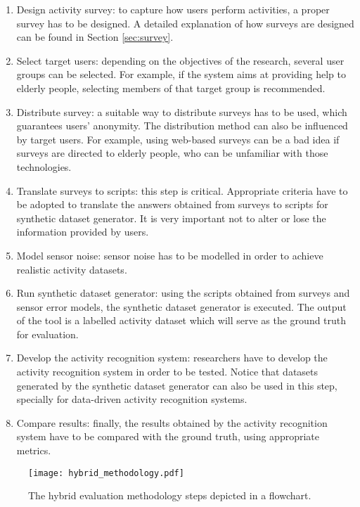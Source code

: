 \begin{enumerate}
 \item Design activity survey: to capture how users perform activities, a proper survey has to be designed. A detailed explanation of how surveys are designed can be found in Section \ref{sec:survey}.
 \item Select target users: depending on the objectives of the research, several user groups can be selected. For example, if the system aims at providing help to elderly people, selecting members of that target group is recommended.
 \item Distribute survey: a suitable way to distribute surveys has to be used, which guarantees users' anonymity. The distribution method can also be influenced by target users. For example, using web-based surveys can be a bad idea if surveys are directed to elderly people, who can be unfamiliar with those technologies. 
 \item Translate surveys to scripts: this step is critical. Appropriate criteria have to be adopted to translate the answers obtained from surveys to scripts for synthetic dataset generator. It is very important not to alter or lose the information provided by users.
 \item Model sensor noise: sensor noise has to be modelled in order to achieve realistic activity datasets. 
 \item Run synthetic dataset generator: using the scripts obtained from surveys and sensor error models, the synthetic dataset generator is executed. The output of the tool is a labelled activity dataset which will serve as the ground truth for evaluation.
 \item Develop the activity recognition system: researchers have to develop the activity recognition system in order to be tested. Notice that datasets generated by the synthetic dataset generator can also be used in this step, specially for data-driven activity recognition systems.
 \item Compare results: finally, the results obtained by the activity recognition system have to be compared with the ground truth, using appropriate metrics.
\end{enumerate}

\begin{figure}[htbp]
\centering
\texttt{[image: hybrid\_methodology.pdf]}
    \caption{The hybrid evaluation methodology steps depicted in a flowchart.}
    \label{fig-methodology}
\end{figure}


